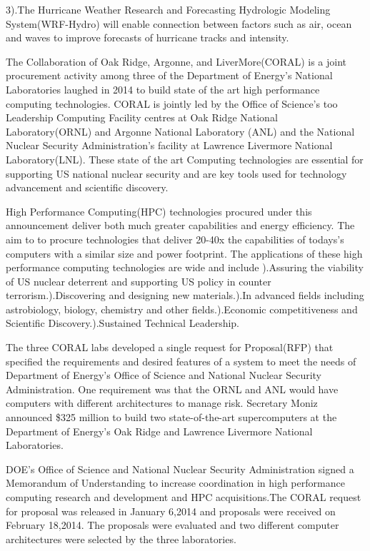 \documentclass[fleqn,letterpaper,12pt]{report}
\begin{document}
3).The Hurricane Weather Research and Forecasting Hydrologic Modeling System(WRF-Hydro) will enable connection between factors such as air, ocean and waves to improve forecasts of hurricane tracks and intensity.
%
\newpage
{}
{}
\problem
The Collaboration of Oak Ridge, Argonne, and LiverMore(CORAL) is a joint procurement activity among three of the Department of Energy’s National Laboratories laughed in 2014 to build state of the art high performance computing technologies. CORAL is jointly led by the Office of Science’s too Leadership Computing Facility centres at Oak Ridge National Laboratory(ORNL) and Argonne  National Laboratory (ANL) and the National Nuclear Security Administration’s facility at Lawrence Livermore National Laboratory(LNL). These state of the art Computing technologies are essential for supporting US national nuclear security and are key tools used for technology advancement and scientific discovery.

High Performance Computing(HPC) technologies procured under this announcement deliver both much greater capabilities and energy efficiency. The aim to to procure technologies that deliver 20-40x the capabilities of todays’s computers with a similar size and power footprint. The applications of these high performance computing technologies are wide and include ).Assuring the viability of US nuclear deterrent and supporting US policy in counter terrorism.).Discovering and designing new materials.).In advanced fields including astrobiology, biology, chemistry and other fields.).Economic competitiveness and Scientific Discovery.).Sustained Technical Leadership.

The three CORAL labs developed a single request for Proposal(RFP) that specified the requirements and desired features of a system to meet the needs of Department of Energy’s Office of Science and National Nuclear Security Administration. One requirement was that the ORNL and ANL would have computers with different architectures to manage risk. Secretary Moniz announced \$325 million to build two state-of-the-art supercomputers at the Department of Energy’s Oak Ridge and Lawrence Livermore National Laboratories.\cite{ORL}

DOE’s Office of Science and National Nuclear Security Administration signed a Memorandum of Understanding to increase coordination in high performance computing research and development and HPC acquisitions.The CORAL request for proposal was released in January 6,2014 and proposals were received on February 18,2014. The proposals were evaluated and two different computer architectures were selected by the three laboratories.\cite{DOE} \cite{IBM}
\end{document}
